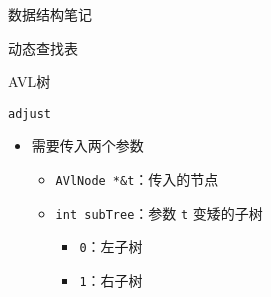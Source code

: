 \documentclass[
  ignorenonframetext,
]{beamer}
\providecommand{\tightlist}{%
  \setlength{\itemsep}{0pt}\setlength{\parskip}{0pt}}
\begin{document}
\begin{frame}[fragile]{数据结构笔记}
\begin{block}{动态查找表}
\begin{block}{AVL树}
\begin{block}{\texttt{adjust}}
\begin{itemize}
  \begin{itemize}
  \tightlist
  \item
    \texttt{true}：子树没有变矮
  \item
    \texttt{false}：子树变矮
  \end{itemize}
\item
  需要传入两个参数

  \begin{itemize}
  \tightlist
  \item
    \texttt{AVlNode\ *\&t}：传入的节点
  \item
    \texttt{int\ subTree}：参数 \texttt{t} 变矮的子树

    \begin{itemize}
    \tightlist
    \item
      \texttt{0}：左子树
    \item
      \texttt{1}：右子树
    \end{itemize}
  \end{itemize}
\end{itemize}


\end{block}
\end{block}
\end{block}
\end{frame}
\end{document}
